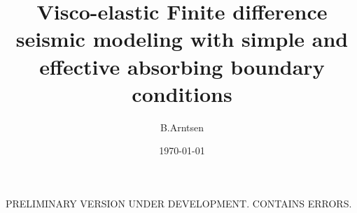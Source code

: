 \documentclass[11pt]{article}
\begin{document}
  
%
\newcommand{\dt}[1]{\partial_t{#1}}
\newcommand{\ddt}[1]{\partial^2_t{#1}}
\newcommand{\dddt}[1]{\partial^3_t{#1}}
\newcommand{\inv}[1]{\frac{1}{#1}}
\newcommand{\diff}[1]{D^+_{#1}}
\newcommand{\difb}[1]{D^-_{#1}}
\title{Visco-elastic Finite difference seismic modeling with 
       simple and effective absorbing boundary conditions}
\author{B.Arntsen}
\date{\today}
\maketitle
\clearpage
PRELIMINARY VERSION UNDER DEVELOPMENT. CONTAINS ERRORS.
\end{document}
